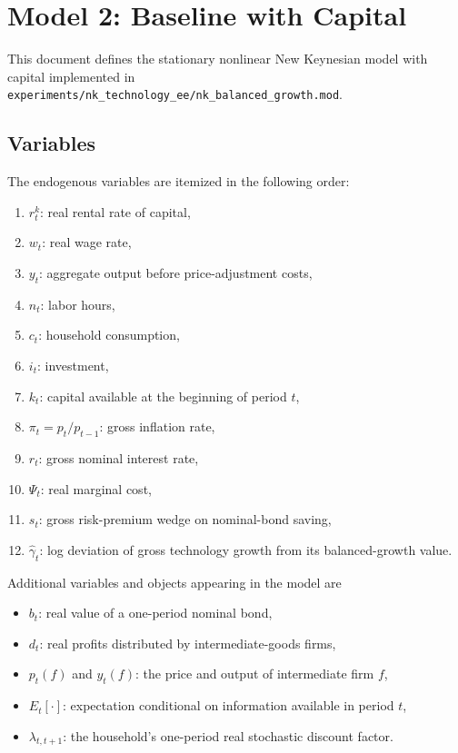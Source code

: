 \documentclass[12pt,final]{article}
\begin{document}

\section{Model 2: Baseline with Capital}
\label{sec:model2-clean}

This document defines the stationary nonlinear New Keynesian model with capital
implemented in \texttt{experiments/nk\_technology\_ee/nk\_balanced\_growth.mod}.

\subsection{Variables}

The endogenous variables are itemized in the following order:
\begin{enumerate}[label=\arabic*.,leftmargin=2.4em]
  \item $r_t^k$: real rental rate of capital,
  \item $w_t$: real wage rate,
  \item $y_t$: aggregate output before price-adjustment costs,
  \item $n_t$: labor hours,
  \item $c_t$: household consumption,
  \item $i_t$: investment,
  \item $k_t$: capital available at the beginning of period $t$,
  \item $\pi_t=p_t/p_{t-1}$: gross inflation rate,
  \item $r_t$: gross nominal interest rate,
  \item $\Psi_t$: real marginal cost,
  \item $s_t$: gross risk-premium wedge on nominal-bond saving,
  \item $\widehat\gamma_t$: log deviation of gross technology growth from its
        balanced-growth value.
\end{enumerate}

Additional variables and objects appearing in the model are
\begin{itemize}[leftmargin=2em]
  \item $b_t$: real value of a one-period nominal bond,
  \item $d_t$: real profits distributed by intermediate-goods firms,
  \item $p_t(f)$ and $y_t(f)$: the price and output of intermediate firm $f$,
  \item $E_t[\cdot]$: expectation conditional on information available in period $t$,
  \item $\lambda_{t,t+1}$: the household's one-period real stochastic discount
        factor.
\end{itemize}
\end{document}
